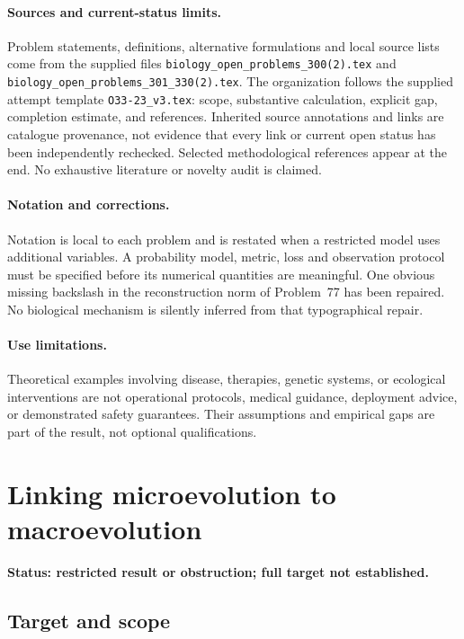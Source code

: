 \documentclass[11pt]{article}
\begin{document}
\paragraph{Sources and current-status limits.}
Problem statements, definitions, alternative formulations and local source lists
come from the supplied files
\texttt{biology\_open\_problems\_300(2).tex} and
\texttt{biology\_open\_problems\_301\_330(2).tex}.
The organization follows the supplied attempt template
\texttt{O33-23\_v3.tex}: scope, substantive calculation, explicit gap,
completion estimate, and references. Inherited source annotations and links are
catalogue provenance, not evidence that every link or current open status has
been independently rechecked. Selected methodological references appear at the
end. No exhaustive literature or novelty audit is claimed.

\paragraph{Notation and corrections.}
Notation is local to each problem and is restated when a restricted model uses
additional variables. A probability model, metric, loss and observation protocol
must be specified before its numerical quantities are meaningful. One obvious
missing backslash in the reconstruction norm of Problem~77 has been repaired.
No biological mechanism is silently inferred from that typographical repair.

\paragraph{Use limitations.}
Theoretical examples involving disease, therapies, genetic systems, or ecological
interventions are not operational protocols, medical guidance, deployment advice,
or demonstrated safety guarantees. Their assumptions and empirical gaps are part
of the result, not optional qualifications.


\section*{Linking microevolution to macroevolution}
\label{prob:160}
\noindent\textbf{Status: restricted result or obstruction; full target not established.}
\subsection{Target and scope}
\end{document}
